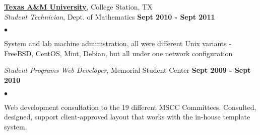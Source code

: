 \documentclass[margin,line]{res}
\newenvironment{list2}
  {\vspace{-4mm}
   \begin{list}{$\bullet$}{
     \setlength{\itemsep}{0in}
     \setlength{\parsep}{0in} \setlength{\parskip}{0in}
     \setlength{\topsep}{0in} \setlength{\partopsep}{0in}
     \setlength{\leftmargin}{0.18in}}}
  {\end{list}}
\begin{document}
\begin{resume}
{\bf \href{http://tamu.edu}{Texas A\&M University}}, College Station, TX \\
{\em Student Technician}, Dept. of Mathematics                    \hfill {\bf Sept 2010 - Sept 2011} \\
\begin{list2}
\item System and lab machine administration, all were different Unix variants - FreeBSD, CentOS, Mint, Debian, but all under one network configuration
\end{list2}

{\em Student Programs Web Developer}, Memorial Student Center     \hfill {\bf Sept 2009 - Sept 2010} \\
\begin{list2}
\item Web development consultation to the 19 different MSCC Committees. Consulted, designed, support client-approved layout that works with the in-house template system.
\end{list2}


%
%

\end{resume}
\end{document}
